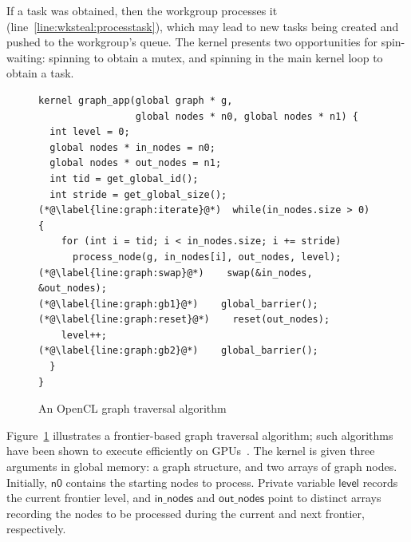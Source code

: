 \documentclass[sigconf]{acmart}
\newcommand{\myfiglong}{Figure~}
\newcommand{\keyword}[1]{\mathsf{#1}}
\begin{document}
If a task was obtained, then the workgroup processes it
(line~\ref{line:wksteal:processtask}), which may lead to new tasks
being created and pushed to the workgroup's queue. The kernel presents
two opportunities for spin-waiting: spinning to obtain a mutex, and
spinning in the main kernel loop to obtain a task.


%
%




\begin{figure}[t]

\begin{lstlisting}
kernel graph_app(global graph * g,
                 global nodes * n0, global nodes * n1) {
  int level = 0;
  global nodes * in_nodes = n0;
  global nodes * out_nodes = n1;
  int tid = get_global_id();
  int stride = get_global_size();
(*@\label{line:graph:iterate}@*)  while(in_nodes.size > 0) {
    for (int i = tid; i < in_nodes.size; i += stride)
      process_node(g, in_nodes[i], out_nodes, level);
(*@\label{line:graph:swap}@*)    swap(&in_nodes, &out_nodes);
(*@\label{line:graph:gb1}@*)    global_barrier();
(*@\label{line:graph:reset}@*)    reset(out_nodes);
    level++;
(*@\label{line:graph:gb2}@*)    global_barrier();
  }
}
\end{lstlisting}
\caption{An OpenCL graph traversal algorithm}\label{fig:graphsearch}
\end{figure}

 \myfiglong\ref{fig:graphsearch} illustrates a frontier-based graph traversal algorithm; such algorithms have
been shown to execute efficiently on GPUs~\cite{BNP12,DBLP:conf/oopsla/PaiP16}.
The kernel is
given three arguments in global memory: a graph structure, and two
arrays of graph nodes. Initially, $\keyword{n0}$ contains the
starting nodes to process. Private variable $\keyword{level}$ records the current frontier level, and $\keyword{in\_nodes}$ and $\keyword{out\_nodes}$ point to
distinct arrays recording the nodes to be processed during the current and next frontier, respectively.
\end{document}
